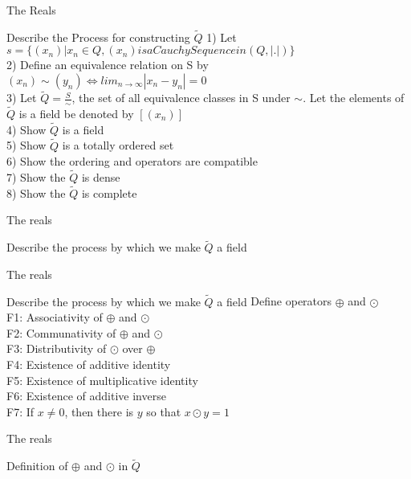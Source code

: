 \documentclass{beamer}
\begin{document}
\begin{frame}{The Reals}

        \begin{block}{Describe the Process for constructing $\widetilde{Q}$}
        	1) Let $s = \{(x_n)|x_n \in Q,(x_n) is a Cauchy Sequence in (Q,|.|)\}$\\
		2) Define an equivalence relation on S by $(x_n) \sim (y_n) \iff lim_{n \rightarrow \infty}|x_n - y_n| = 0$\\
		3) Let $\widetilde{Q} = \frac{S}{\sim}$, the set of all equivalence classes in S under $\sim$. Let the elements of $\widetilde{Q}$ is a field be denoted by $[(x_n)]$\\
		4) Show $\widetilde{Q}$ is a field\\
		5) Show $\widetilde{Q}$ is a totally ordered set\\
		6) Show the ordering and operators are compatible\\
		7) Show the $\widetilde{Q}$ is dense\\
		8) Show the $\widetilde{Q}$ is complete\\
	\end{block}
\end{frame}

\begin{frame}{The reals}
	\begin{block}{Describe the process by which we make $\widetilde{Q}$ a field}
	\end{block}
\end{frame}

\begin{frame}{The reals}
        \begin{block}{Describe the process by which we make $\widetilde{Q}$ a field}
		Define operators $\oplus$ and $\odot$\\
		F1: Associativity of $\oplus$ and $\odot$\\
		F2: Communativity of $\oplus$ and $\odot$\\
		F3: Distributivity of $\odot$ over $\oplus$\\
		F4: Existence of additive identity\\
		F5: Existence of multiplicative identity\\
		F6: Existence of additive inverse\\
		F7: If $x \neq 0$, then there is $y$ so that $x \odot y = 1$
	\end{block}
\end{frame}

\begin{frame}{The reals}
	\begin{block}{Definition of $\oplus$ and $\odot$ in $\widetilde{Q}$}
        \end{block}
\end{frame}
\end{document}
